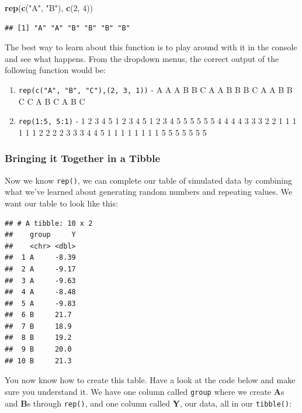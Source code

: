 \documentclass[]{book}
\newenvironment{Shaded}{\begin{snugshade}}{\end{snugshade}}
\newcommand{\DecValTok}[1]{\textcolor[rgb]{0.00,0.00,0.81}{#1}}
\newcommand{\KeywordTok}[1]{\textcolor[rgb]{0.13,0.29,0.53}{\textbf{#1}}}
\newcommand{\NormalTok}[1]{#1}
\newcommand{\StringTok}[1]{\textcolor[rgb]{0.31,0.60,0.02}{#1}}
\begin{document}
\begin{Shaded}
\begin{Highlighting}[]
\KeywordTok{rep}\NormalTok{(}\KeywordTok{c}\NormalTok{(}\StringTok{"A"}\NormalTok{, }\StringTok{"B"}\NormalTok{), }\KeywordTok{c}\NormalTok{(}\DecValTok{2}\NormalTok{, }\DecValTok{4}\NormalTok{))}
\end{Highlighting}
\end{Shaded}

\begin{verbatim}
## [1] "A" "A" "B" "B" "B" "B"
\end{verbatim}

The best way to learn about this function is to play around with it in the console and see what happens. From the dropdown menus, the correct output of the following function would be:

\begin{enumerate}
\def\labelenumi{\arabic{enumi}.}
\item
  \texttt{rep(c("A",\ "B",\ "C"),(2,\ 3,\ 1))} - A A A B B C A A B B B C A A B B C C A B C A B C
\item
  \texttt{rep(1:5,\ 5:1)} - 1 2 3 4 5 1 2 3 4 5 1 2 3 4 5 5 5 5 5 5 4 4 4 4 3 3 3 2 2 1 1 1 1 1 1 2 2 2 2 3 3 3 4 4 5 1 1 1 1 1 1 1 1 5 5 5 5 5 5 5
\end{enumerate}

\hypertarget{bringing-it-together-in-a-tibble}{%
\subsubsection{Bringing it Together in a Tibble}\label{bringing-it-together-in-a-tibble}}

Now we know \texttt{rep()}, we can complete our table of simulated data by combining what we've learned about generating random numbers and repeating values. We want our table to look like this:

\begin{verbatim}
## # A tibble: 10 x 2
##    group     Y
##    <chr> <dbl>
##  1 A     -8.39
##  2 A     -9.17
##  3 A     -9.63
##  4 A     -8.48
##  5 A     -9.83
##  6 B     21.7 
##  7 B     18.9 
##  8 B     19.2 
##  9 B     20.0 
## 10 B     21.3
\end{verbatim}

You now know how to create this table. Have a look at the code below and make sure you understand it. We have one column called \texttt{group} where we create \textbf{A}s and \textbf{B}s through \texttt{rep()}, and one column called \textbf{Y}, our data, all in our \texttt{tibble()}:
\end{document}
